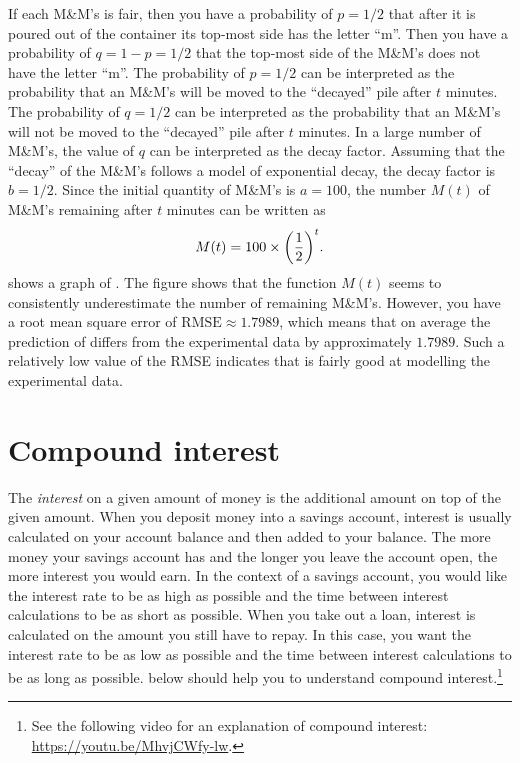 \documentclass[a4paper,oneside,12pt]{article}
\begin{document}
{\begin{solution}
If each M\&M's is fair, then you have a probability of $p = 1 / 2$
that after it is poured out of the container its top-most side has the
letter ``m''.  Then you have a probability of $q = 1 - p = 1 / 2$ that
the top-most side of the M\&M's does not have the letter ``m''.  The
probability of $p = 1 / 2$ can be interpreted as the probability that
an M\&M's will be moved to the ``decayed'' pile after $t$ minutes.
The probability of $q = 1 / 2$ can be interpreted as the probability
that an M\&M's will not be moved to the ``decayed'' pile after $t$
minutes.  In a large number of M\&M's, the value of $q$ can be
interpreted as the decay factor.  Assuming that the ``decay'' of the
M\&M's follows a model of exponential decay, the decay factor is
$b = 1 / 2$.  Since the initial quantity of M\&M's is $a = 100$, the
number $M(t)$ of M\&M's remaining after $t$ minutes can be written as
\begin{equation}
\label{eqn:exponential:MnM_probability_model}
M(t)
=
100
\times
\parenthesis*{
  \frac{1}{2}
}^t.
\end{equation}
 shows a graph of
.  The figure shows
that the function $M(t)$ seems to consistently underestimate the
number of remaining M\&M's.  However, you have a root mean square
error of $\text{RMSE} \approx 1.7989$, which means that on average the
prediction of  differs
from the experimental data by approximately $1.7989$.  Such a
relatively low value of the RMSE indicates that
 is fairly good at
modelling the experimental data.
\end{solution}
}{}



\section{Compound interest}

The \emph{interest} on a given amount of money is the additional
amount on top of the given amount.  When you deposit money into a
savings account, interest is usually calculated on your account
balance and then added to your balance.  The more money your savings
account has and the longer you leave the account open, the more
interest you would earn.  In the context of a savings account, you
would like the interest rate to be as high as possible and the time
between interest calculations to be as short as possible.  When you
take out a loan, interest is calculated on the amount you still have
to repay.  In this case, you want the interest rate to be as low as
possible and the time between interest calculations to be as long as
possible.   below should help
you to understand compound interest.\footnote{
  See the following video for an explanation of compound interest:
  \url{https://youtu.be/MhvjCWfy-lw}.
}
\end{document}
